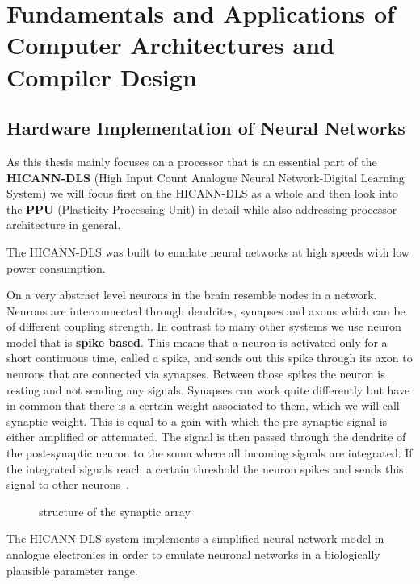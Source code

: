 \chapter{Fundamentals and Applications of Computer Architectures and Compiler Design}
\label{chapter:methods}

\section{Hardware Implementation of Neural Networks}
As this thesis mainly focuses on a processor that is an essential part of the \textbf{HICANN-DLS} (High Input Count Analogue Neural Network-Digital Learning System) we will focus first on the HICANN-DLS as a whole and then look into the \textbf{PPU} (Plasticity Processing Unit) in detail while also addressing processor architecture in general.

The HICANN-DLS was built to emulate neural networks at high speeds with low power consumption.

On a very abstract level neurons in the brain resemble nodes in a network.
Neurons are interconnected through dendrites, synapses and axons which can be of different coupling strength. 
In contrast to many other systems  we use neuron model that is \textbf{spike based}.
This means that a neuron is activated only for a short continuous time, called a spike, and sends out this spike through its axon to neurons that are connected via synapses.
Between those spikes the neuron is resting and not sending any signals.
Synapses can work quite differently but have in common that there is a certain weight associated to them, which we will call synaptic weight.
This is equal to a gain with which the pre-synaptic signal is either amplified or attenuated.
The signal is then passed through the dendrite of the post-synaptic neuron to the soma where all incoming signals are integrated.
If the integrated signals reach a certain threshold the neuron spikes and sends this signal to other neurons~\citep{silbernagl2009color}.

\begin{figure}
    
    \caption{\label{fig:array} structure of the synaptic array}
\end{figure}

The HICANN-DLS system implements a simplified neural network model in analogue electronics in order to emulate neuronal networks in a biologically plausible parameter range.

